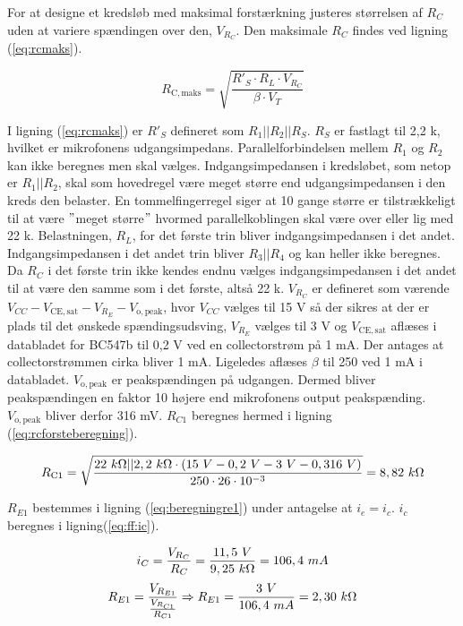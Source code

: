 For at designe et kredsløb med maksimal forstærkning justeres størrelsen af $R_C$ uden at variere spændingen over den, $V_{R_C}$. Den maksimale $R_C$ findes ved ligning (\ref{eq:rcmaks}).

\begin{equation}
R_{\mathrm{C,maks}} = \sqrt{\frac{R'_S \cdot R_L \cdot V_{R_C}}{\beta \cdot V_T}}
\label{eq:rcmaks}
\end{equation}

I ligning (\ref{eq:rcmaks}) er $R'_S$ defineret som $R_1||R_2||R_S$. $R_S$ er fastlagt til 2,2 k\ohm, hvilket er mikrofonens udgangsimpedans. Parallelforbindelsen mellem $R_1$ og $R_2$ kan ikke beregnes men skal vælges. Indgangsimpedansen i kredsløbet, som netop er $R_1||R_2$, skal som hovedregel være meget større end udgangsimpedansen i den kreds den belaster. En tommelfingerregel siger at 10 gange større er tilstrækkeligt til at være $"$meget større$"$ hvormed parallelkoblingen skal være over eller lig med 22 k\ohm. 
Belastningen, $R_L$, for det første trin bliver indgangsimpedansen i det andet. Indgangsimpedansen i det andet trin bliver $R_3||R_4$ og kan heller ikke beregnes. Da $R_C$ i det første trin ikke kendes endnu vælges indgangsimpedansen i det andet til at være den samme som i det første, altså 22 k\ohm. 
$V_{R_C}$ er defineret som værende $V_{CC} - V_{\mathrm{CE,sat}} - V_{R_E} - V_{\mathrm{o,peak}}$, hvor $V_{CC}$ vælges til 15 V så der sikres at der er plads til det ønskede spændingsudsving, $V_{R_E}$ vælges til 3 V og $V_{\mathrm{CE,sat}}$ aflæses i databladet for BC547b til 0,2 V ved en collectorstrøm på 1 mA. Der antages at collectorstrømmen cirka bliver 1 mA. Ligeledes aflæses $\beta$ til 250 ved 1 mA i databladet. $V_{\mathrm{o,peak}}$ er peakspændingen på udgangen. Dermed bliver peakspændingen en faktor 10 højere end mikrofonens output peakspænding. $V_{\mathrm{o,peak}}$ bliver derfor 316 mV. $R_{C1}$ beregnes hermed i ligning (\ref{eq:rcforsteberegning}).

\begin{equation}
R_{\mathrm{C1}} = \sqrt{\frac{22~k\ohm || 2,2~k\ohm \cdot (15~V - 0,2~V - 3~V - 0,316~V)}{250 \cdot 26 \cdot 10^{-3}}}=8,82~k\ohm
\label{eq:rcforsteberegning}
\end{equation}

$R_{E1}$ bestemmes i ligning (\ref{eq:beregningre1}) under antagelse at $i_e = i_c$.  $i_c$ beregnes i ligning(\ref{eq:ff:ic}).

\begin{equation}
\label{eq:ff:ic}
i_C=\frac{V_{R_C}}{R_C}=\frac{11,5~V}{9,25~k\ohm}=106,4~mA
\end{equation}
\begin{equation}
R_{E1}=\frac{V_{R_{E1}}}{\frac{V_{R_{C1}}}{R_{C1}}}  \Rightarrow R_{E1}=\frac{3~V}{106,4~mA}=2,30~k\ohm
\label{eq:beregningre1}
\end{equation}


